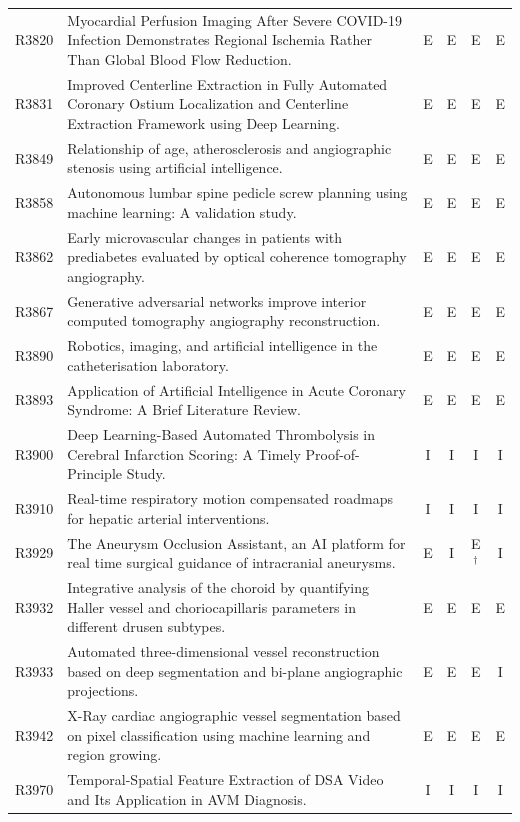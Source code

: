 \begin{longtable}{@{}l p{8.6cm} c c c c@{}}
R3820 & Myocardial Perfusion Imaging After Severe COVID-19 Infection Demonstrates Regional Ischemia Rather Than Global Blood Flow Reduction. & E & E & E & E \\
R3831 & Improved Centerline Extraction in Fully Automated Coronary Ostium Localization and Centerline Extraction Framework using Deep Learning. & E & E & E & E \\
R3849 & Relationship of age, atherosclerosis and angiographic stenosis using artificial intelligence. & E & E & E & E \\
R3858 & Autonomous lumbar spine pedicle screw planning using machine learning: A validation study. & E & E & E & E \\
R3862 & Early microvascular changes in patients with prediabetes evaluated by optical coherence tomography angiography. & E & E & E & E \\
R3867 & Generative adversarial networks improve interior computed tomography angiography reconstruction. & E & E & E & E \\
R3890 & Robotics, imaging, and artificial intelligence in the catheterisation laboratory. & E & E & E & E \\
R3893 & Application of Artificial Intelligence in Acute Coronary Syndrome: A Brief Literature Review. & E & E & E & E \\
R3900 & Deep Learning-Based Automated Thrombolysis in Cerebral Infarction Scoring: A Timely Proof-of-Principle Study. & I & I & I & I \\
R3910 & Real-time respiratory motion compensated roadmaps for hepatic arterial interventions. & I & I & I & I \\
R3929 & The Aneurysm Occlusion Assistant, an AI platform for real time surgical guidance of intracranial aneurysms. & E & I & E$^{\dagger}$ & I \\
R3932 & Integrative analysis of the choroid by quantifying Haller vessel and choriocapillaris parameters in different drusen subtypes. & E & E & E & E \\
R3933 & Automated three-dimensional vessel reconstruction based on deep segmentation and bi-plane angiographic projections. & E & E & E & I \\
R3942 & X-Ray cardiac angiographic vessel segmentation based on pixel classification using machine learning and region growing. & E & E & E & E \\
R3970 & Temporal-Spatial Feature Extraction of DSA Video and Its Application in AVM Diagnosis. & I & I & I & I \\

\end{longtable}
